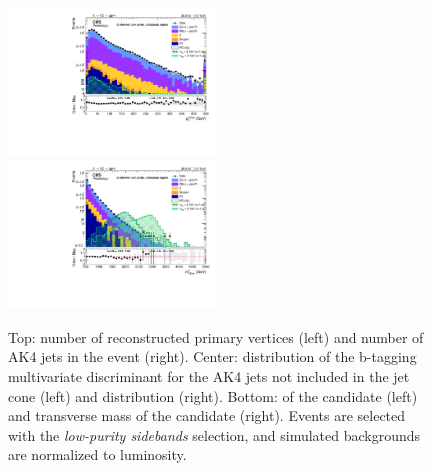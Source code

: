 \begin{figure}[!htb]
\begin{center}
    \includegraphics[width=0.495\textwidth]{plots/v9_U/XVZnnlpSB/X_pt.pdf}
    \includegraphics[width=0.495\textwidth]{plots/v9_U/XVZnnlpSB/X_tmass.pdf}

    \caption{Top: number of reconstructed primary vertices (left) and number of AK4 jets in the event (right). Center: distribution of the b-tagging multivariate discriminant for the AK4 jets not included in the \V jet cone (left) and \MET distribution (right). Bottom: \pt of the \VZ candidate (left) and transverse mass of the \VZ candidate (right). Events are selected with the \emph{low-purity sidebands} selection, and simulated backgrounds are normalized to luminosity.}
  \end{center}
\end{figure}

\clearpage


